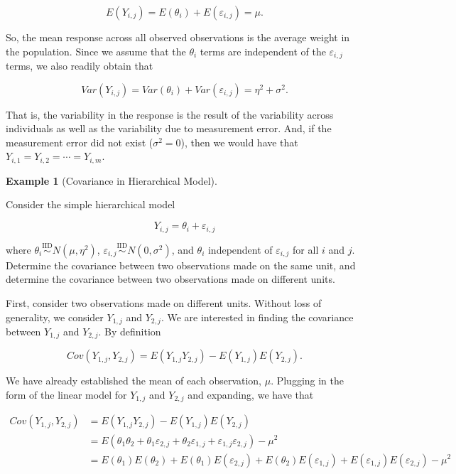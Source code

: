 \documentclass[
  letterpaper,
  DIV=11,
  numbers=noendperiod]{scrreprt}
\theoremstyle{definition}
\theoremstyle{plain}
\theoremstyle{definition}
\newtheorem{example}{Example}[chapter]
\theoremstyle{remark}
\begin{document}
\[E\left(Y_{i,j}\right) = E\left(\theta_i\right) + E\left(\varepsilon_{i,j}\right) = \mu.\]

So, the mean response across all observed observations is the average
weight in the population. Since we assume that the \(\theta_i\) terms
are independent of the \(\varepsilon_{i,j}\) terms, we also readily
obtain that

\[Var\left(Y_{i,j}\right) = Var\left(\theta_i\right) + Var\left(\varepsilon_{i,j}\right) = \eta^2 + \sigma^2.\]

That is, the variability in the response is the result of the
variability across individuals as well as the variability due to
measurement error. And, if the measurement error did not exist
(\(\sigma^2 = 0\)), then we would have that
\(Y_{i,1} = Y_{i,2} = \dotsb = Y_{i,m}\).

\begin{example}[Covariance in Hierarchical
Model]\protect\hypertarget{exm-covariance-blocks}{}\label{exm-covariance-blocks}

Consider the simple hierarchical model

\[Y_{i,j} = \theta_i + \varepsilon_{i,j}\]

where
\(\theta_i \stackrel{\text{IID}}{\sim} N\left(\mu, \eta^2\right)\),
\(\varepsilon_{i,j} \stackrel{\text{IID}}{\sim} N\left(0, \sigma^2\right)\),
and \(\theta_i\) independent of \(\varepsilon_{i,j}\) for all \(i\) and
\(j\). Determine the covariance between two observations made on the
same unit, and determine the covariance between two observations made on
different units.

\end{example}

First, consider two observations made on different units. Without loss
of generality, we consider \(Y_{1,j}\) and \(Y_{2,j}\). We are
interested in finding the covariance between \(Y_{1,j}\) and
\(Y_{2,j}\). By definition

\[Cov\left(Y_{1,j}, Y_{2,j}\right) = E\left(Y_{1,j} Y_{2,j}\right) - E\left(Y_{1,j}\right)E\left(Y_{2,j}\right).\]

We have already established the mean of each observation, \(\mu\).
Plugging in the form of the linear model for \(Y_{1,j}\) and \(Y_{2,j}\)
and expanding, we have that

\[
\begin{aligned}
  Cov\left(Y_{1,j}, Y_{2,j}\right)
    &= E\left(Y_{1,j} Y_{2,j}\right) - E\left(Y_{1,j}\right)E\left(Y_{2,j}\right) \\
    &= E\left(\theta_1\theta_2 + \theta_1 \varepsilon_{2,j} + \theta_2 \varepsilon_{1,j} + \varepsilon_{1,j}\varepsilon_{2,j}\right) - \mu^2 \\
    &= E\left(\theta_1\right)E\left(\theta_2\right) + E\left(\theta_1\right) E\left(\varepsilon_{2,j}\right) + E\left(\theta_2\right) E\left(\varepsilon_{1,j}\right) + E\left(\varepsilon_{1,j}\right)E\left(\varepsilon_{2,j}\right) - \mu^2 
\end{aligned}
\]
\end{document}

